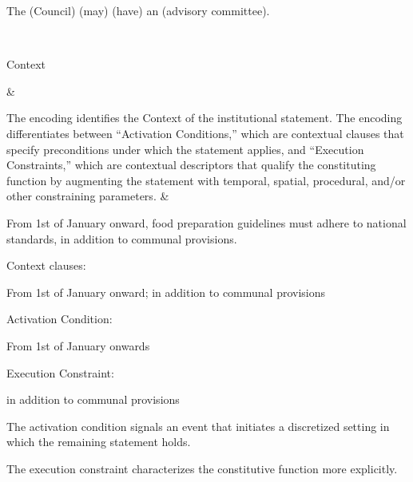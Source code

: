 \begin{landscape}
\begin{longtable}{\tabledims}
\vspace{4.0cm}

\begin{exi}
The \E{}(Council) \M{}(may) \F{}(have) an \Pp{}(advisory committee).\end{exi}

\\

\newpage

\midrule

\begin{emp}Context\end{emp} &

The encoding identifies the Context of the institutional statement. The encoding differentiates between ``Activation Conditions,'' which are contextual clauses that specify preconditions under which the statement applies, and ``Execution Constraints,'' which are contextual descriptors that qualify the constituting function by augmenting the statement with temporal, spatial, procedural, and/or other constraining parameters. &


\begin{exi}From 1st of January onward, food preparation guidelines must adhere to national standards, in addition to communal provisions.\end{exi}

\sp

Context clauses: \begin{exi}From 1st of January onward; in addition to communal provisions\end{exi}

\sp


\sp

Activation Condition: \begin{exi}From 1st of January onwards\end{exi}

\sp

Execution Constraint: \begin{exi}in addition to communal provisions\end{exi}

\sp

The activation condition signals an event that initiates a discretized setting in which the remaining statement holds.

\sp

The execution constraint characterizes the constitutive function more explicitly. 


\end{longtable}
\end{landscape}
